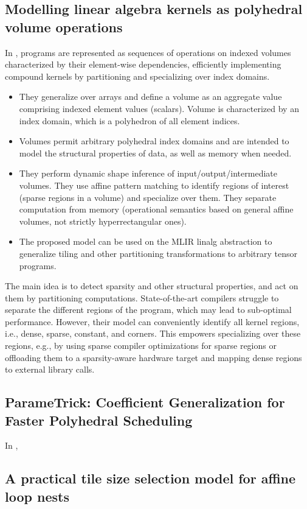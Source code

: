 \subsection{Modelling linear algebra kernels as polyhedral volume operations}
In \cite{friebel2022modelling}, programs are represented as sequences of operations on indexed volumes characterized by their element-wise dependencies, efficiently implementing compound kernels by partitioning and specializing over index domains.
\begin{itemize}
    \item They generalize over arrays and define a volume as an aggregate value comprising indexed element values (scalars). Volume is characterized by an index domain, which is a polyhedron of all element indices.
    \item Volumes permit arbitrary polyhedral index domains and are intended to model the structural properties of data, as well as memory when needed.
    \item They perform dynamic shape inference of input/output/intermediate volumes. They use affine pattern matching to identify regions of interest (sparse regions in a volume) and specialize over them. They separate computation from memory (operational semantics based on general affine volumes, not strictly hyperrectangular ones).
    \item The proposed model can be used on the MLIR linalg abstraction to generalize tiling and other partitioning transformations to arbitrary tensor programs.
\end{itemize}
The main idea is to detect sparsity and other structural properties, and act on them by partitioning computations. State-of-the-art compilers struggle to separate the different regions of the program, which may lead to sub-optimal performance. However, their model can conveniently identify all kernel regions, i.e., dense, sparse, constant, and corners. This empowers specializing over these regions, e.g., by using sparse compiler optimizations for sparse regions or offloading them to a sparsity-aware hardware target and mapping dense regions to external library calls.

\subsection{ParameTrick: Coefficient Generalization for Faster Polyhedral Scheduling}
In \cite{consolaro24-parametrick}, 

\subsection{A practical tile size selection model for affine loop nests}

